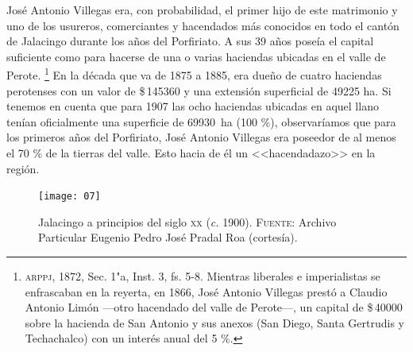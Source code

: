 \documentclass[14pt,twoside,final]{extbook} %
\let\oldfootnote\footnote
\renewcommand\footnote[1]{%
\oldfootnote{\hspace{1mm}#1}}
\begin{document}
José Antonio Villegas era, con probabilidad, el primer hijo de este matrimonio y uno de los usureros, comerciantes y hacendados más conocidos en todo el cantón de Jalacingo durante los años del Porfiriato. A sus 39 años poseía el capital suficiente como para hacerse de una o varias haciendas ubicadas en el valle de Perote.\footnote{\textsc{arppj}, 1872, Sec. 1"a, Inst. 3, fs. 5-8. Mientras liberales e imperialistas se enfrascaban en la reyerta, en 1866, José Antonio Villegas prestó a Claudio Antonio Limón ---otro hacendado del valle de Perote---, un capital de \$\,40000 sobre la hacienda de San Antonio y sus anexos (San Diego, Santa Gertrudis y Techachalco) con un interés anual del 5 \%.} En la década que va de 1875 a 1885, era dueño de cuatro haciendas perotenses con un valor de \$\,145360 y una extensión superficial de 49225 ha. Si tenemos en cuenta que para 1907 las ocho haciendas ubicadas en aquel llano tenían oficialmente una superficie de 69930~ha (100 \%), observaríamos que para los primeros años del Porfiriato, José Antonio Villegas era poseedor de al menos el 70 \% de la tierras del valle. Esto hacia de él un <<hacendadazo>> en la región.
\begin{figure}
\centering
\texttt{[image: 07]}
\caption[Jalacingo a principios del siglo \textsc{xx}]{Jalacingo a principios del siglo \textsc{xx} (\emph{c.} 1900). \textsc{Fuente:} Archivo Particular Eugenio Pedro José Pradal Roa (cortesía).}
\label{fig:jalacingo-photo}
\end{figure}
\end{document}
